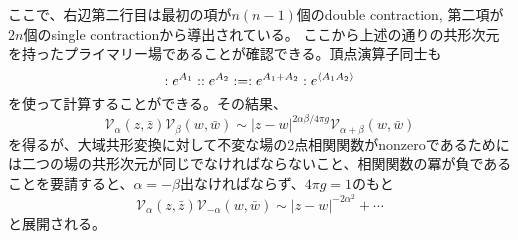 \documentclass[11pt, aps, longbibliography]{article}
\numberwithin{equation}{section}
\begin{document}
        ここで、右辺第二行目は最初の項が$n(n-1)$個のdouble contraction, 第二項が$2n$個のsingle contractionから導出されている。
        ここから上述の通りの共形次元を持ったプライマリー場であることが確認できる。頂点演算子同士も
        \begin{equation}\label{eq:freeboson2-6}
            :e^{A_1}::e^{A_2}: = :e^{A_1+A_2}:e^{\expval{A_1A_2}}
        \end{equation}
        を使って計算することができる。その結果、
        \begin{equation}\label{eq:freeboson2-7}
            \mathcal{V}_\alpha(z,\bar{z})\mathcal{V}_{\beta}(w,\bar{w}) \sim |z-w|^{2\alpha\beta/4\pi g}\mathcal{V}_{\alpha+\beta}(w,\bar{w})
        \end{equation}
        を得るが、大域共形変換に対して不変な場の2点相関関数がnonzeroであるためには二つの場の共形次元が同じでなければならないこと、相関関数の冪が負であることを要請すると、$\alpha = -\beta$出なければならず、$4\pi g=1$のもと
        \begin{equation}\label{eq:freeboson2-8}
            \mathcal{V}_\alpha(z,\bar{z})\mathcal{V}_{-\alpha}(w,\bar{w}) \sim |z-w|^{-2\alpha^2} + \cdots
        \end{equation}
        と展開される。
\end{document}
